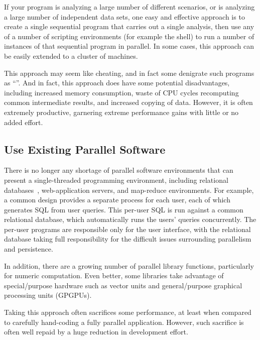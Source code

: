 If your program is analyzing a large number of different scenarios,
or is analyzing a large number of independent data sets, one easy
and effective approach is to create a single sequential program that
carries out a single analysis, then use any of a number of scripting
environments (for example the  shell) to run a number of
instances of that sequential program in parallel.
In some cases, this approach can be easily extended to a cluster of
machines.

This approach may seem like cheating, and in fact some denigrate such
programs as ``''.
And in fact, this approach does have some potential disadvantages,
including increased memory consumption, waste of CPU cycles recomputing
common intermediate results, and increased copying of data.
However, it is often  extremely productive, garnering extreme performance
gains with little or no added effort.

\subsection{Use Existing Parallel Software}
\label{sec:intro:Use Existing Parallel Software}

There is no longer any shortage of parallel software environments that
can present a single-threaded programming environment,
including relational
databases~\cite{Date82},
web-application servers, and map-reduce environments.
For example, a common design provides a separate process for each
user, each of which generates SQL from user queries.
This per-user SQL is run against a common relational database, which
automatically runs the users' queries concurrently.
The per-user programs are responsible only for the user interface,
with the relational database taking full responsibility for the
difficult issues surrounding parallelism and persistence.

In addition, there are a growing number of parallel library functions,
particularly for numeric computation.
Even better, some libraries take advantage of special\-/purpose
hardware such as vector units and general\-/purpose graphical processing
units (GPGPUs).

Taking this approach often sacrifices some performance, at least when
compared to carefully hand-coding a fully parallel application.
However, such sacrifice is often well repaid by a huge reduction in
development effort.

\QuickQuizEnd

